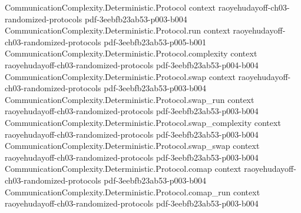 \begin{theorem}
\label{CommunicationComplexity.Functions.Equality.publicCoin_communicationComplexity_le_of_hε}
\leanok
{}
\proofstep
  {CommunicationComplexity.Deterministic.Protocol}
  {context}
  {raoyehudayoff-ch03-randomized-protocols}
  {pdf-3eebfb23ab53-p003-b004}
\proofstep
  {CommunicationComplexity.Deterministic.Protocol.run}
  {context}
  {raoyehudayoff-ch03-randomized-protocols}
  {pdf-3eebfb23ab53-p005-b001}
\proofstep
  {CommunicationComplexity.Deterministic.Protocol.complexity}
  {context}
  {raoyehudayoff-ch03-randomized-protocols}
  {pdf-3eebfb23ab53-p004-b004}
\proofstep
  {CommunicationComplexity.Deterministic.Protocol.swap}
  {context}
  {raoyehudayoff-ch03-randomized-protocols}
  {pdf-3eebfb23ab53-p003-b004}
\proofstep
  {CommunicationComplexity.Deterministic.Protocol.swap_run}
  {context}
  {raoyehudayoff-ch03-randomized-protocols}
  {pdf-3eebfb23ab53-p003-b004}
\proofstep
  {CommunicationComplexity.Deterministic.Protocol.swap_complexity}
  {context}
  {raoyehudayoff-ch03-randomized-protocols}
  {pdf-3eebfb23ab53-p003-b004}
\proofstep
  {CommunicationComplexity.Deterministic.Protocol.swap_swap}
  {context}
  {raoyehudayoff-ch03-randomized-protocols}
  {pdf-3eebfb23ab53-p003-b004}
\proofstep
  {CommunicationComplexity.Deterministic.Protocol.comap}
  {context}
  {raoyehudayoff-ch03-randomized-protocols}
  {pdf-3eebfb23ab53-p003-b004}
\proofstep
  {CommunicationComplexity.Deterministic.Protocol.comap_run}
  {context}
  {raoyehudayoff-ch03-randomized-protocols}
  {pdf-3eebfb23ab53-p003-b004}
\proofstep

\end{theorem}
